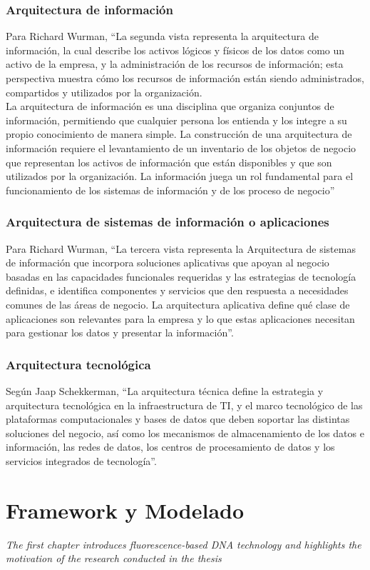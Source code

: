   \subsection{Arquitectura de información}
  Para Richard Wurman, “La segunda vista representa la arquitectura de información, la cual describe los activos lógicos y físicos de los datos como un activo de la empresa, y la administración de los recursos de información; esta perspectiva muestra cómo los recursos de información están siendo administrados, compartidos y utilizados por la organización. \\
  La arquitectura de información es una disciplina que organiza conjuntos de información, permitiendo que cualquier persona los entienda y los integre a su propio conocimiento de manera simple. La construcción de una arquitectura de información requiere el levantamiento de un inventario de los objetos de negocio que representan los activos de información que están disponibles y que son utilizados por la organización. La información juega un rol fundamental para el funcionamiento de los sistemas de información y de los proceso de negocio”
  \subsection{Arquitectura de sistemas de información o aplicaciones}
  Para Richard Wurman, “La tercera vista representa la Arquitectura de sistemas de información que incorpora soluciones aplicativas que apoyan al negocio basadas en las capacidades funcionales requeridas y las estrategias de tecnología definidas, e identifica componentes y servicios que den respuesta a necesidades comunes de las áreas de negocio. La arquitectura aplicativa define qué clase de aplicaciones son relevantes para la empresa y lo que estas aplicaciones necesitan para gestionar los datos y presentar la información”.
  \subsection{Arquitectura tecnológica}
  Según Jaap Schekkerman, “La arquitectura técnica define la estrategia y arquitectura tecnológica en la infraestructura de TI, y el marco tecnológico de las plataformas computacionales y bases de datos que deben soportar las distintas soluciones del negocio, así como los mecanismos de almacenamiento de los datos e información, las redes de datos, los centros de procesamiento de datos y los servicios integrados de tecnología”.
 
\chapter{Framework y Modelado}
\label{chap:Archimate}
\textit{The first chapter introduces fluorescence-based DNA technology and highlights the motivation of the research conducted in the thesis}
\vfill
\minitoc
\newpage

